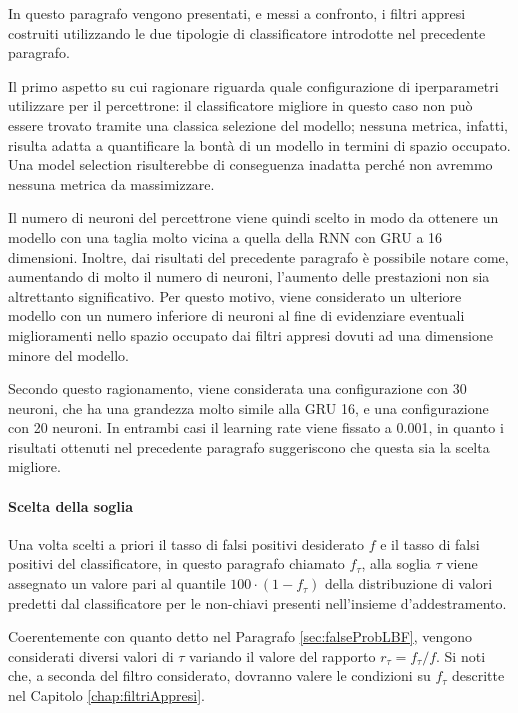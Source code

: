 \documentclass[../../main.tex]{subfiles}
\begin{document}
    In questo paragrafo vengono presentati, e messi a confronto, i filtri appresi costruiti utilizzando le due tipologie di classificatore introdotte nel precedente paragrafo.

    Il primo aspetto su cui ragionare riguarda quale configurazione di iperparametri utilizzare per il percettrone: il classificatore migliore in questo caso non può essere trovato tramite una classica selezione del modello; nessuna metrica, infatti, risulta adatta a quantificare la bontà di un modello in termini di spazio occupato. Una model selection risulterebbe di conseguenza inadatta perché non avremmo nessuna metrica da massimizzare.

    Il numero di neuroni del percettrone viene quindi scelto in modo da ottenere un modello con una taglia molto vicina a quella della RNN con GRU a 16 dimensioni. Inoltre, dai risultati del precedente paragrafo è possibile notare come, aumentando di molto il numero di neuroni, l'aumento delle prestazioni non sia altrettanto significativo. Per questo motivo, viene considerato un ulteriore modello con un numero inferiore di neuroni al fine di evidenziare eventuali miglioramenti nello spazio occupato dai filtri appresi dovuti ad una dimensione minore del modello.

    Secondo questo ragionamento, viene considerata una configurazione con 30 neuroni, che ha una grandezza molto simile alla GRU 16, e una configurazione con 20 neuroni. In entrambi casi il learning rate viene fissato a 0.001, in quanto i risultati ottenuti nel precedente paragrafo suggeriscono che questa sia la scelta migliore.
    
    \paragraph{Scelta della soglia}
    Una volta scelti a priori il tasso di falsi positivi desiderato $f$ e il tasso di falsi positivi del classificatore, in questo paragrafo chiamato $f_{\tau}$, alla soglia $\tau$ viene assegnato un valore pari al quantile $100 \cdot (1 - f_{\tau})$ della distribuzione di valori predetti dal classificatore per le non-chiavi presenti nell'insieme d'addestramento.

    Coerentemente con quanto detto nel Paragrafo \ref{sec:falseProbLBF}, vengono considerati diversi valori di $\tau$ variando il valore del rapporto $r_{\tau} = f_{\tau}/f$. Si noti che, a seconda  del filtro considerato, dovranno valere le condizioni su $f_{\tau}$ descritte nel Capitolo \ref{chap:filtriAppresi}.
\end{document}
